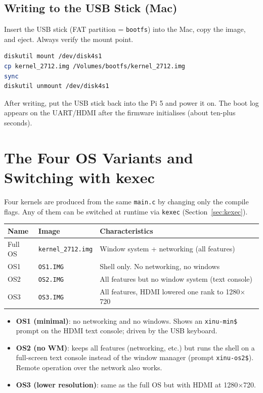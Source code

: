 \documentclass[a4paper,11pt]{article}
\begin{document}
\subsection{Writing to the USB Stick (Mac)}
Insert the USB stick (FAT partition = \texttt{bootfs}) into the Mac, copy
the image, and eject. Always verify the mount point.

\begin{lstlisting}[language=bash]
diskutil mount /dev/disk4s1
cp kernel_2712.img /Volumes/bootfs/kernel_2712.img
sync
diskutil unmount /dev/disk4s1
\end{lstlisting}

After writing, put the USB stick back into the Pi 5 and power it on. The
boot log appears on the UART/HDMI after the firmware initialises (about
ten-plus seconds).

\section{The Four OS Variants and Switching with kexec}
\label{sec:variants}

Four kernels are produced from the same \texttt{main.c} by changing only
the compile flags. Any of them can be switched at runtime via
\texttt{kexec} (Section~\ref{sec:kexec}).

\begin{longtable}{lll}
\hline
Name & Image & Characteristics \\
\hline
Full OS & \texttt{kernel\_2712.img} & Window system + networking (all features) \\
OS1 & \texttt{OS1.IMG} & Shell only. No networking, no windows \\
OS2 & \texttt{OS2.IMG} & All features but no window system (text console) \\
OS3 & \texttt{OS3.IMG} & All features, HDMI lowered one rank to 1280$\times$720 \\
\hline
\end{longtable}

\begin{itemize}[noitemsep]
  \item \textbf{OS1 (minimal)}: no networking and no windows. Shows an
        \texttt{xinu-min\$} prompt on the HDMI text console; driven by the
        USB keyboard.
  \item \textbf{OS2 (no WM)}: keeps all features (networking, etc.) but runs
        the shell on a full-screen text console instead of the window manager
        (prompt \texttt{xinu-os2\$}). Remote operation over the network also
        works.
  \item \textbf{OS3 (lower resolution)}: same as the full OS but with HDMI at
        1280$\times$720.
\end{itemize}
\end{document}
